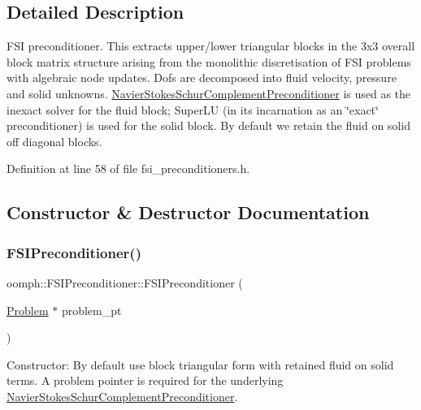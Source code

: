 \subsection{Detailed Description}
F\+SI preconditioner. This extracts upper/lower triangular blocks in the 3x3 overall block matrix structure arising from the monolithic discretisation of F\+SI problems with algebraic node updates. Dofs are decomposed into fluid velocity, pressure and solid unknowns. \hyperlink{classoomph_1_1NavierStokesSchurComplementPreconditioner}{Navier\+Stokes\+Schur\+Complement\+Preconditioner} is used as the inexact solver for the fluid block; Super\+LU (in its incarnation as an \char`\"{}exact\char`\"{} preconditioner) is used for the solid block. By default we retain the fluid on solid off diagonal blocks. 

Definition at line 58 of file fsi\+\_\+preconditioners.\+h.



\subsection{Constructor \& Destructor Documentation}
\mbox{\label{classoomph_1_1FSIPreconditioner_aee06474cc9aabbde2dacb2cff1317a78}} 
\subsubsection{\texorpdfstring{F\+S\+I\+Preconditioner()}{FSIPreconditioner()}\hspace{0.1cm}{\footnotesize\ttfamily [1/2]}}
{\footnotesize\ttfamily oomph\+::\+F\+S\+I\+Preconditioner\+::\+F\+S\+I\+Preconditioner (\begin{DoxyParamCaption}\item[{\hyperlink{classoomph_1_1Problem}{Problem} $\ast$}]{problem\+\_\+pt }\end{DoxyParamCaption})\hspace{0.3cm}{\ttfamily [inline]}}



Constructor\+: By default use block triangular form with retained fluid on solid terms. A problem pointer is required for the underlying \hyperlink{classoomph_1_1NavierStokesSchurComplementPreconditioner}{Navier\+Stokes\+Schur\+Complement\+Preconditioner}. 



